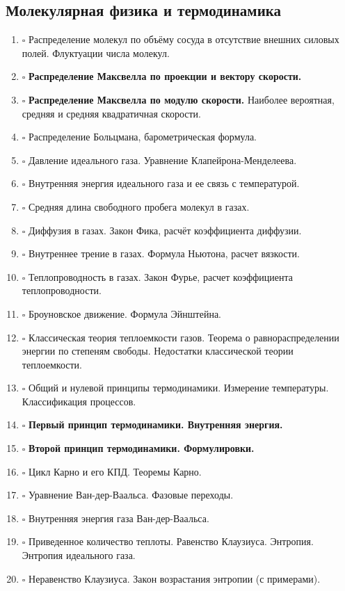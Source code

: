 \begin{multicols}{2}
	\subsection*{Молекулярная физика и термодинамика}
	\begin{enumerate}[leftmargin=*,itemsep=0cm,parsep=0cm,start=15]
		\item $\square$ Распределение молекул по объёму сосуда в отсутствие внешних силовых полей. Флуктуации числа молекул.
		\item $\square$ \textbf{Распределение Максвелла по проекции и вектору скорости. }
		\item $\square$ \textbf{Распределение Максвелла по модулю скорости.} Наиболее вероятная, средняя и средняя квадратичная скорости.
		\item $\square$ Распределение Больцмана, барометрическая формула.
		\item $\square$ Давление идеального газа. Уравнение Клапейрона-Менделеева.
		\item $\square$ Внутренняя энергия идеального газа и ее связь с температурой.
		\item $\square$ Средняя длина свободного пробега молекул в газах.
		\item $\square$ Диффузия в газах. Закон Фика, расчёт коэффициента диффузии.
		\item $\square$ Внутреннее трение в газах. Формула Ньютона, расчет вязкости.
		\item $\square$ Теплопроводность в газах. Закон Фурье, расчет коэффициента теплопроводности.
		\item $\square$ Броуновское движение. Формула Эйнштейна.
		\item $\square$ Классическая теория теплоемкости газов. Теорема о равнораспределении энергии по степеням свободы. Недостатки классической теории теплоемкости.
		\item $\square$ Общий и нулевой принципы термодинамики. Измерение температуры. Классификация процессов.
		\item $\square$ \textbf{Первый принцип термодинамики. Внутренняя энергия.}
		\item $\square$ \textbf{Второй принцип термодинамики. Формулировки.}
		\item $\square$ Цикл Карно и его КПД. Теоремы Карно.
		\item $\square$ Уравнение Ван-дер-Ваальса. Фазовые переходы.
		\item $\square$ Внутренняя энергия газа Ван-дер-Ваальса.
		\item $\square$ Приведенное количество теплоты. Равенство Клаузиуса. Энтропия. Энтропия идеального газа.
		\item $\square$ Неравенство Клаузиуса. Закон возрастания энтропии (с примерами).
	\end{enumerate}
\end{multicols}